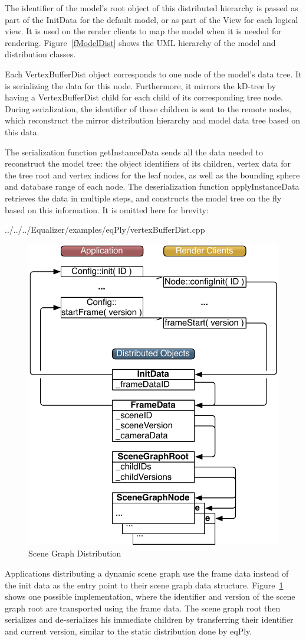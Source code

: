 \documentclass[10pt,a4]{scrartcl}
\newcommand{\fig}[1]{Figure~\ref{#1}}
\begin{document}
The identifier of the model's root object of this distributed hierarchy
is passed as part of the \textsf{InitData} for the default model, or as
part of the \textsf{View} for each logical view. It is used on the
render clients to map the model when it is needed for
rendering. \fig{fModelDist} shows the UML hierarchy of the model and
distribution classes.

Each \textsf{VertexBufferDist} object corresponds to one node of the
model's data tree. It is serializing the data for this
node. Furthermore, it mirrors the kD-tree by having a
\textsf{VertexBufferDist} child for each child of its corresponding tree
node. During serialization, the identifier of these children is sent to
the remote nodes, which reconstruct the mirror distribution hierarchy
and model data tree based on this data.

The serialization function \textsf{getInstanceData} sends all the data
needed to reconstruct the model tree: the object identifiers of its
children, vertex data for the tree root and vertex indices for the leaf
nodes, as well as the bounding sphere and database range of each
node. The deserialization function \textsf{applyInstanceData} retrieves
the data in multiple steps, and constructs the model tree on the fly
based on this information. It is omitted here for brevity:

{\footnotesize
  {../../../Equalizer/examples/eqPly/vertexBufferDist.cpp}}

\begin{figure}[ht!]\center
  \includegraphics[width=.618\textwidth]{images/objects.pdf}
  {\caption{\label{fObjects}Scene Graph Distribution}}
\end{figure}
Applications distributing a dynamic scene graph use the frame data
instead of the init data as the entry point to their scene graph data
structure. \fig{fObjects} shows one possible implementation, where the
identifier and version of the scene graph root are transported using the
frame data. The scene graph root then serializes and de-serializes his
immediate children by transferring their identifier and current version,
similar to the static distribution done by \textsf{eqPly}.
\end{document}
